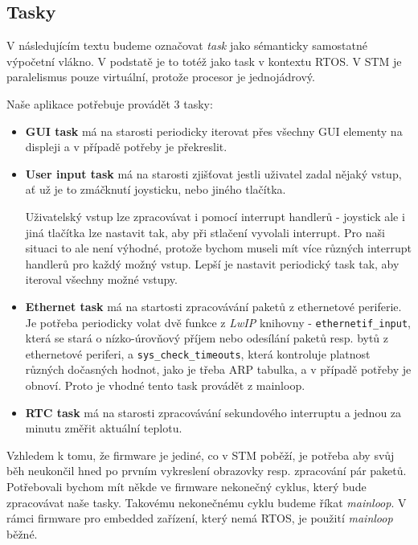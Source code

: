 \subsection{Tasky}

V následujícím textu budeme označovat \emph{task} jako sémanticky samostatné výpočetní
vlákno.
V podstatě je to totéž jako task v kontextu RTOS.
V STM je paralelismus pouze virtuální, protože procesor je jednojádrový.

Naše aplikace potřebuje provádět 3 tasky:
\begin{itemize}
  \item \textbf{GUI task} má na starosti periodicky iterovat přes všechny GUI elementy
    na displeji a v případě potřeby je překreslit.

  \item \textbf{User input task} má na starosti zjišťovat jestli uživatel zadal nějaký
    vstup, ať už je to zmáčknutí joysticku, nebo jiného tlačítka.

    Uživatelský vstup lze zpracovávat i pomocí interrupt handlerů - joystick
    ale i jiná tlačítka lze nastavit tak, aby při stlačení vyvolali interrupt.
    Pro naši situaci to ale není výhodné, protože bychom museli mít více různých
    interrupt handlerů pro každý možný vstup.
    Lepší je nastavit periodický task tak, aby iteroval všechny možné vstupy.

  \item \textbf{Ethernet task} má na startosti zpracovávání paketů z ethernetové
    periferie. Je potřeba periodicky volat dvě funkce z \textit{LwIP} knihovny -
    \texttt{ethernetif\_input}, která se stará o nízko-úrovňový příjem nebo odesílání paketů resp.
    bytů z ethernetové periferi, a \texttt{sys\_check\_timeouts}, která kontroluje platnost různých
    dočasných hodnot, jako je třeba ARP tabulka, a v případě potřeby je obnoví.
    Proto je vhodné tento task provádět z mainloop.

  \item \textbf{RTC task} má na starosti zpracovávání sekundového interruptu a jednou za
    minutu změřit aktuální teplotu.
\end{itemize}

Vzhledem k tomu, že firmware je jediné, co v STM poběží, je potřeba aby svůj běh neukončil
hned po prvním vykreslení obrazovky resp. zpracování pár paketů.
Potřebovali bychom mít někde ve firmware nekonečný cyklus, který bude zpracovávat naše
tasky.
Takovému nekonečnému cyklu budeme říkat \emph{mainloop}.
V rámci firmware pro embedded zařízení, který nemá RTOS, je použití \emph{mainloop} běžné.

